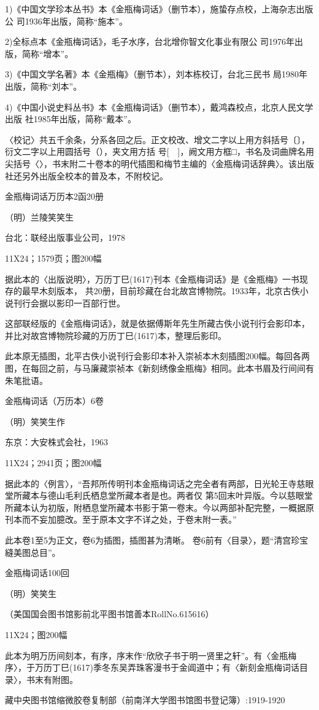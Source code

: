 1)《中国文学珍本丛书》本《金瓶梅词话》（删节本），施蛰存点校，上海杂志出版公 司1936年出版，简称“施本”。

2)全标点本《金瓶梅词话》，毛子水序，台北增你智文化事业有限公 司1976年出版，简称“增本”。

3)《中国文学名著》本《金瓶梅》（删节本），刘本栋校订，台北三民书 局1980年出版，简称“刘本”。

4)《中国小说史料丛书》本《金瓶梅词话》（删节本），戴鸿森校点，北京人民文学出版 社1985年出版，简称“戴本”。

〈校记〉共五千余条，分系各回之后。正文校改、增文二字以上用方斜括号〔〕，衍文二字以上用圆括号（），夹文用方括 号[　]，阙文用方框□，书名及词曲牌名用尖括号〈〉，书末附二十卷本的明代插图和梅节主编的〈金瓶梅词话辞典〉。该出版社还另外出版全校本的普及本，不附校记。





金瓶梅词话万历本2函20册

（明）兰陵笑笑生

台北：联经出版事业公司，1978

11X24；1579页；图200幅

据此本的〈出版说明〉，万历丁巳(1617)刊本《金瓶梅词话》是《金瓶梅》一书现存的最早木刻版本， 共20册，目前珍藏在台北故宫博物院。1933年，北京古佚小说刊行会据以影印一百部行世。

这部联经版的《金瓶梅词话》，就是依据傅斯年先生所藏古佚小说刊行会影印本，并比对故宫博物院珍藏的万历丁巳(1617)本，整理后影印。

此本原无插图，北平古佚小说刊行会影印本补入崇祯本木刻插图200幅。每回各两图，在每回之前，与马廉藏崇祯本《新刻绣像金瓶梅》相同。此本书眉及行间间有朱笔批语。




金瓶梅词话（万历本）6卷

（明）笑笑生作

东京：大安株式会社，1963

11X24；2941页；图200幅

据此本的〈例言〉，“吾邦所传明刊本金瓶梅词话之完全者有两部，日光轮王寺慈眼堂所藏本与德山毛利氏栖息堂所藏本者是也。两者仅 第5回末叶异版。今以慈眼堂所藏本认为初版，附栖息堂所藏本书影于第一卷末。今以两部补配完整，一概据原刊本而不妄加臆改。至于原本文字不详之处，于卷末附一表。”

此本卷1至5为正文，卷6为插图，插图甚为清晰。 卷6前有〈目录〉，题“清宫珍宝縫美图总目”。



金瓶梅词话100回

（明）笑笑生

（美国国会图书馆影前北平图书馆善本RollNo.615616）

11X24；图200幅

此本为明万历间刻本，有序，序末作“欣欣子书于明一贤里之轩”。有〈金瓶梅序〉，于万历丁巳(1617)季冬东吴弄珠客漫书于金阊道中；有〈新刻金瓶梅词话目录〉，书末有附图。

藏中央图书馆缩微胶卷复制部（前南洋大学图书馆图书登记簿）:1919-1920

